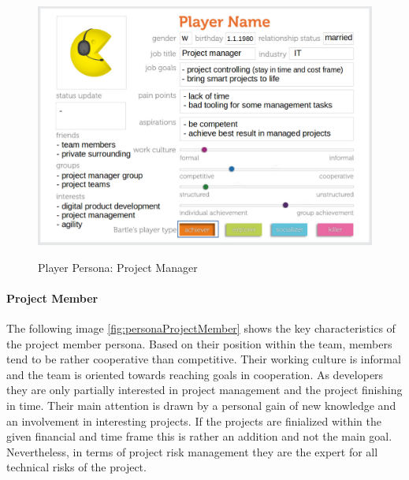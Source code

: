 \begin{figure}[H]
	\centering
	\includegraphics[width=1.0\textwidth]{Content/Domain/PersonaProjectManager.png}
	\caption{Player Persona: Project Manager}
	\label{fig:personaProjectManager}
	\cite[p. 88; adapted]{kumarGamificationWorkDesigning2013}
\end{figure}

\paragraph*{Project Member}

The following image \ref{fig:personaProjectMember} shows the key characteristics of the project member persona.
Based on their position within the team, members tend to be rather cooperative than competitive. Their working culture is informal and the team is oriented towards reaching goals in cooperation. As developers they are only partially interested in project management and the project finishing in time. Their main attention is drawn by a personal gain of new knowledge and an involvement in interesting projects. If the projects are finialized within the given financial and time frame this is rather an addition and not the main goal. Nevertheless, in terms of project risk management they are the expert for all technical risks of the project.

